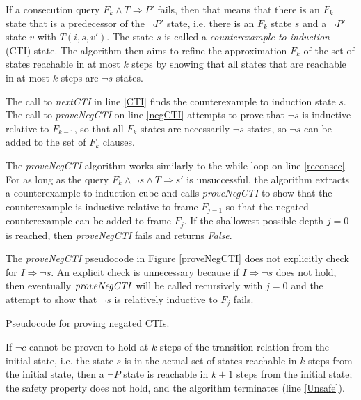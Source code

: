 \documentclass[12pt,a4paper,twoside,openright]{report}
\begin{document}
{If a consecution query $F_k \wedge T \Rightarrow P'$ fails, then that means that
there is an $F_k$ state that is a predecessor of the $\neg P'$ state,
i.e. there is an $F_k$ state $s$ and a $\neg P'$ state $v$ with $T(i,s,v')$.
The state $s$ is called a \emph{counterexample to induction} (CTI) state.
The algorithm then aims to refine the approximation $F_k$ of the set of states
reachable in at most $k$ steps by showing that all states that are
reachable in at most $k$ steps are $\neg s$ states.

The call to {\it nextCTI} in line \ref{CTI} finds the counterexample to
induction state $s$. The call to {\it proveNegCTI} on line \ref{negCTI}
attempts to prove that $\neg s$ is inductive relative to $F_{k - 1}$,
so that all $F_k$ states are necessarily $\neg s$ states, so $\neg s$ can
be added to the set of $F_k$ clauses.

The {\it proveNegCTI} algorithm works similarly to the
while loop on line \ref{reconsec}. For as long as the query
$F_k \wedge \neg s \wedge T \Rightarrow s'$ is unsuccessful,
the algorithm extracts a counterexample to induction cube and
calls {\it proveNegCTI} to show that the counterexample is
inductive relative to frame $F_{j - 1}$ so that the negated
counterexample can be added to frame $F_j$.
If the shallowest possible depth $j = 0$ is reached, then
{\it proveNegCTI} fails and returns {\it False}.

The {\it proveNegCTI} pseudocode in Figure \ref{proveNegCTI}
does not explicitly check for $I \Rightarrow
\neg s$. An explicit check is unnecessary because if
$I \Rightarrow \neg s$ does not hold, then eventually ${\it proveNegCTI}$
will be called recursively with $j = 0$ and the attempt to show that
$\neg s$ is relatively inductive to $F_j$ fails.

\begin{algorithm}[t]
\DontPrintSemicolon
{}
\caption{Pseudocode for proving negated CTIs.}
\label{proveNegCTI}
\end{algorithm}

If $\neg c$ cannot be proven to hold at $k$ steps of
the transition relation from the initial state, i.e. the state $s$ is in the actual
set of states reachable in $k$ steps from the initial state, then a $\neg P$ state
is reachable in $k + 1$ steps from the initial state; the safety property does not
hold, and the algorithm terminates (line \ref{Unsafe}).

}
\end{document}
